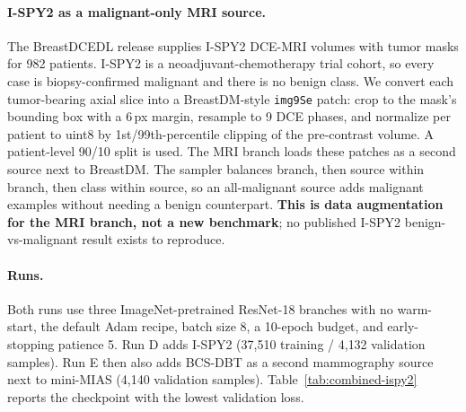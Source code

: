 \documentclass[11pt]{article}
\begin{document}
\paragraph{I-SPY2 as a malignant-only MRI source.} The BreastDCEDL release
\citep{fridman2025breastdcedl} supplies I-SPY2 DCE-MRI volumes with tumor
masks for 982 patients. I-SPY2 is a neoadjuvant-chemotherapy trial cohort,
so every case is biopsy-confirmed malignant and there is no benign class.
We convert each tumor-bearing axial slice into a BreastDM-style
\texttt{img9Se} patch: crop to the mask's bounding box with a 6\,px margin,
resample to 9 DCE phases, and normalize per patient to uint8 by
1st/99th-percentile clipping of the pre-contrast volume. A patient-level
90/10 split is used. The MRI branch loads these patches as a second source
next to BreastDM. The sampler balances branch, then source within branch,
then class within source, so an all-malignant source adds malignant
examples without needing a benign counterpart. \textbf{This is data
augmentation for the MRI branch, not a new benchmark}; no published I-SPY2
benign-vs-malignant result exists to reproduce.

\paragraph{Runs.} Both runs use three ImageNet-pretrained ResNet-18
branches with no warm-start, the default Adam recipe, batch size 8, a
10-epoch budget, and early-stopping patience 5. Run D adds I-SPY2 (37{,}510
training / 4{,}132 validation samples). Run E then also adds BCS-DBT as a
second mammography source next to mini-MIAS (4{,}140 validation samples).
Table~\ref{tab:combined-ispy2} reports the checkpoint with the lowest
validation loss.

\begin{table}[htbp]
  \centering
  \caption{Combined 3-branch fusion with I-SPY2 (Run D) and with I-SPY2 plus BCS-DBT (Run E). Validation sample counts per branch in parentheses. Selection is by lowest validation loss.}
  \label{tab:combined-ispy2}
\end{table}
\end{document}
